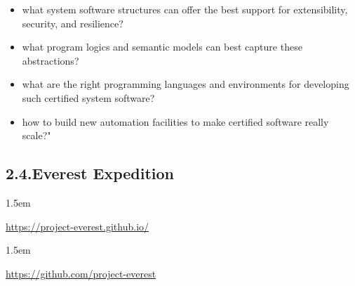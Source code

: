 \documentclass[12pt,twoside]{article}
\begin{document}
\begin{itemize}[noitemsep,topsep=\mdcompacttopsep]%

\item{}what system software structures can offer the best support for extensibility, security, and resilience?%

\item{}what program logics and semantic models can best capture these abstractions?%

\item{}what are the right programming languages and environments for developing such certified system software?%

\item{}how to build new automation facilities to make certified software really scale?"%
\end{itemize}%

\subsection{2.4.\hspace*{0.5em}Everest Expedition}%

\begin{mddefinitions}%


\begin{mdbmarginx}{}{}{}{1.5em}%
\begin{mddefdata}%
\href{https://project-everest.github.io/}{{\ttfamily https://\hspace{0pt}project-\hspace{0pt}everest.\hspace{0pt}github.\hspace{0pt}io/\hspace{0pt}}}
\end{mddefdata}%
\end{mdbmarginx}%


\begin{mdbmarginx}{}{}{}{1.5em}%
\begin{mddefdata}%
\href{https://github.com/project-everest}{{\ttfamily https://\hspace{0pt}github.\hspace{0pt}com/\hspace{0pt}project-\hspace{0pt}everest}}%
\end{mddefdata}%
\end{mdbmarginx}%
\end{mddefinitions}%
\end{document}

